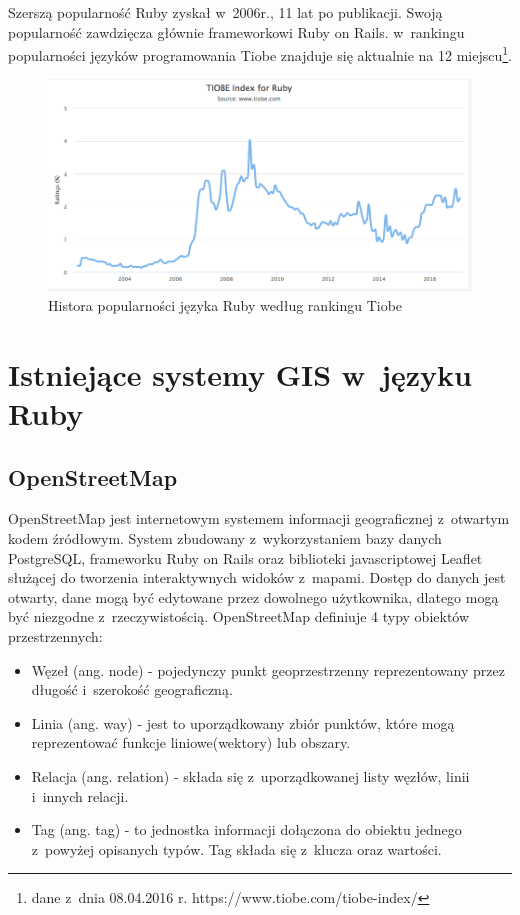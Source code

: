 \documentclass[printmode]{mgr}
\begin{document}
Szerszą popularność Ruby zyskał w~2006r., 11 lat po publikacji. Swoją popularność zawdzięcza głównie frameworkowi Ruby on Rails. w~rankingu popularności języków programowania Tiobe znajduje się aktualnie na 12 miejscu\footnote{dane z~dnia 08.04.2016 r. https://www.tiobe.com/tiobe-index/}.

\begin{figure}[H]
  \centering
  \includegraphics[width=1\linewidth]{pictures/ruby_tiobe}
  \caption{Histora popularności języka Ruby według rankingu Tiobe}
  \label{fig:ruby_tiobe}
\end{figure}

\chapter{Istniejące systemy GIS w~języku Ruby}

\section{OpenStreetMap}

  OpenStreetMap jest internetowym systemem informacji geograficznej z~otwartym kodem źródłowym. System zbudowany z~wykorzystaniem bazy danych PostgreSQL, frameworku Ruby on Rails oraz biblioteki javascriptowej Leaflet służącej do tworzenia interaktywnych widoków z~mapami. Dostęp do danych jest otwarty, dane mogą być edytowane przez dowolnego użytkownika, dlatego mogą być niezgodne z~rzeczywistością. OpenStreetMap definiuje 4 typy obiektów przestrzennych\cite{doc_osm}:
  \begin{itemize}
    \item Węzeł (ang. node) - pojedynczy punkt geoprzestrzenny reprezentowany przez długość i~szerokość geograficzną.
    \item Linia (ang. way) - jest to uporządkowany zbiór punktów, które mogą reprezentować funkcje liniowe(wektory) lub obszary.
    \item Relacja (ang. relation) - składa się z~uporządkowanej listy węzłów, linii i~innych relacji.
    \item Tag (ang. tag) - to jednostka informacji dołączona do obiektu jednego z~powyżej opisanych typów. Tag składa się z~klucza oraz wartości. 
  \end{itemize}
\end{document}
